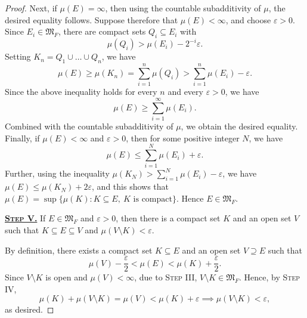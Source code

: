 \documentclass[11pt]{article}
\theoremstyle{thmstyle}
\theoremstyle{defstyle}
\newcommand{\frakM}{\mathfrak{M}} %
\renewcommand{\le}{\leqslant}
\renewcommand{\ge}{\geqslant}
\begin{document}
\begin{proof}
    Next, if $\mu(E) = \infty$, then using the countable subadditivity of $\mu$, the desired equality follows. Suppose therefore that $\mu(E) < \infty$, and choose $\varepsilon > 0$. Since $E_i\in\frakM_F$, there are compact sets $Q_i\subseteq E_i$ with 
    \begin{equation*}
        \mu(Q_i) > \mu(E_i) - 2^{-i}\varepsilon.
    \end{equation*}
    Setting $K_n = Q_1\cup\dots\cup Q_n$, we have 
    \begin{equation*}
        \mu(E)\ge\mu(K_n) = \sum_{i = 1}^n\mu(Q_i) > \sum_{i = 1}^n\mu(E_i) - \varepsilon.
    \end{equation*}
    Since the above inequality holds for every $n$ and every $\varepsilon > 0$, we have 
    \begin{equation*}
        \mu(E)\ge\sum_{i = 1}^\infty\mu(E_i).
    \end{equation*}
    Combined with the countable subadditivity of $\mu$, we obtain the desired equality. Finally, if $\mu(E) < \infty$ and $\varepsilon > 0$, then for some positive integer $N$, we have 
    \begin{equation*}
        \mu(E) \le \sum_{i = 1}^N\mu(E_i) + \varepsilon.
    \end{equation*}
    Further, using the inequality $\mu(K_N) > \sum_{i = 1}^N \mu(E_i) - \varepsilon$, we have $\mu(E)\le\mu(K_N) + 2\varepsilon$, and this shows that $\mu(E) = \sup\{\mu(K)\colon K\subseteq E,~K\text{ is compact}\}$. Hence $E\in\frakM_F$.

    \vspace{0.5cm}

    \noindent\underline{\textbf{\textsc{Step  V.}}} If $E\in\frakM_F$ and $\varepsilon > 0$, then there is a compact set $K$ and an open set $V$ such that $K\subseteq E\subseteq V$ and $\mu(V\setminus K) < \varepsilon$.

    By definition, there exists a compact set $K\subseteq E$ and an open set $V\supseteq E$ such that 
    \begin{equation*}
        \mu(V) - \frac{\varepsilon}{2} < \mu(E) < \mu(K) + \frac{\varepsilon}{2}.
    \end{equation*}
    Since $V\setminus K$ is open and $\mu(V) < \infty$, due to \textsc{Step III}, $V\setminus K\in\frakM_F$. Hence, by \textsc{Step IV}, 
    \begin{equation*}
        \mu(K) + \mu(V\setminus K) = \mu(V) < \mu(K) + \varepsilon\implies\mu(V\setminus K) < \varepsilon,
    \end{equation*}
    as desired.


\end{proof}
\end{document}
